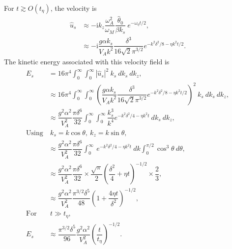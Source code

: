 \documentclass[12pt,psfig]{article}
\begin{document}
For $t\gtrsim O(t_\eta)$, the velocity is
\begin{align*}
\hat{u}_s&\approx -\mathrm{i}k_z\dfrac{\omega_A^2}{\omega_M}\dfrac{\hat{\theta}_0}{\beta k_s} \ e^{-\omega_\eta t/2},\\
&\approx -\mathrm{i}\dfrac{g\alpha k_s }{V_A  k^2}\dfrac{\delta^3}{16\sqrt{2}\pi^{3/2}}e^{-k^2\delta^2/8 -\eta k^2 t/2} .
\end{align*}
The kinetic energy associated with this velocity field is
\begin{align*}
E_s&=16\pi^4\int_{0}^{\infty}\int_{0}^{\infty}|\hat{u}_s|^2 \ k_s \ dk_s \ dk_z,\\
&\approx 16\pi^4\int_{0}^{\infty}\int_{0}^{\infty}\left(\dfrac{g\alpha k_s }{V_A  k^2}\dfrac{\delta^3}{16\sqrt{2}\pi^{3/2}}e^{-k^2\delta^2/8-\eta k^2 t/2} \right)^2 \ k_s \ dk_s \ dk_z,\\
&\approx \dfrac{g^2\alpha^2}{V_A^2}\dfrac{\pi\delta^6}{32 }\int_{0}^{\infty}\int_{0}^{\infty}\dfrac{ k_s^3 }{ k^4}e^{-k^2\delta^2/4-\eta k^2 t}   \ dk_s \ dk_z,\\
\text{Using}& \ k_s=k\cos\theta, \ k_z=k\sin\theta, \\
&\approx \dfrac{g^2\alpha^2}{V_A^2}\dfrac{\pi\delta^6}{32 }\int_{0}^{\infty}\ e^{-k^2\delta^2/4-\eta k^2 t}   \ dk \int_{0}^{\pi/2}\cos^3\theta \ d\theta,\\
&\approx \dfrac{g^2\alpha^2}{V_A^2}\dfrac{\pi\delta^6}{32 }\times \dfrac{\sqrt{\pi}}{2}\left(\dfrac{\delta^2}{4}+\eta t\right)^{-1/2}\times \dfrac{2}{3},\\
&\approx \dfrac{g^2\alpha^2}{V_A^2}\dfrac{\pi^{3/2}\delta^5}{48}\left(1+\dfrac{4\eta t}{\delta^2}\right)^{-1/2},\\
\text{For}& \ t\gg t_\eta,\\
E_{s}&\approx \dfrac{\pi^{3/2}\delta^5}{96}\dfrac{g^2\alpha^2}{V_A^2}\left(\dfrac{ t}{t_\eta}\right)^{-1/2}.
\end{align*}
\end{document}
